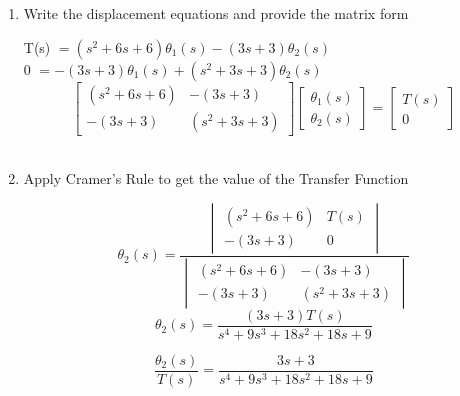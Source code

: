 ﻿\documentclass[11pt]{article}
\begin{document}
\begin{enumerate}[label=(\alph*),itemindent=*, leftmargin=*, nolistsep]
\vspace{15pt}
    \item Write the displacement equations and provide the matrix form
\begin{center}
    T(s) $= (s^2 + 6s + 6)\theta_1(s) - (3s + 3)\theta_2(s)$\\
    0 $= -(3s + 3)\theta_1(s) + (s^2 + 3s + 3)\theta_2(s)$\\
    \[
        \begin{bmatrix}
        (s^2 + 6s + 6) & -(3s + 3) \\
        -(3s + 3) & (s^2 + 3s + 3)
        \end{bmatrix}
        \begin{bmatrix}
        \theta_1(s) \\
        \theta_2(s)
        \end{bmatrix}
        =
        \begin{bmatrix}
        T(s)\\
        0
        \end{bmatrix}
    \]\\
\end{center}
\vspace{15pt}
    \item Apply Cramer's Rule to get the value of the Transfer Function
\begin{center}
    \[
        \theta_2(s) = 
            \frac{\begin{vmatrix}
                (s^2 + 6s + 6) & T(s)\\
                -(3s + 3) & 0
            \end{vmatrix}
        }{\begin{vmatrix}
                (s^2 + 6s + 6) & -(3s + 3) \\
                -(3s + 3) & (s^2 + 3s + 3)
            \end{vmatrix}
        }
    \]
    \[
    \theta_2(s) = \frac{(3s+3)T(s)}{s^4 + 9s^3 + 18s^2 + 18s + 9}
    \] 

    \[
    \boxed{\frac{\theta_2(s)}{T(s)} = \frac{3s+3}{s^4 + 9s^3 + 18s^2 + 18s + 9}}
    \] 

\end{center}
\end{enumerate}

\end{document}
